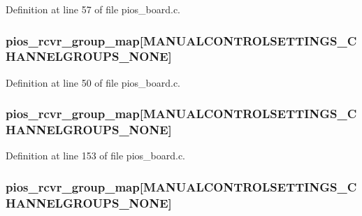 Definition at line 57 of file pios\-\_\-board.\-c.

\hypertarget{group___open_pilot_core_ga6c6cfc16eb738e47c123298e062297e2}{
\subsubsection[{pios\-\_\-rcvr\-\_\-group\-\_\-map}]{ pios\-\_\-rcvr\-\_\-group\-\_\-map\mbox{[}M\-A\-N\-U\-A\-L\-C\-O\-N\-T\-R\-O\-L\-S\-E\-T\-T\-I\-N\-G\-S\-\_\-\-C\-H\-A\-N\-N\-E\-L\-G\-R\-O\-U\-P\-S\-\_\-\-N\-O\-N\-E\mbox{]}}}\label{group___open_pilot_core_ga6c6cfc16eb738e47c123298e062297e2}


Definition at line 50 of file pios\-\_\-board.\-c.

\hypertarget{group___open_pilot_core_ga6c6cfc16eb738e47c123298e062297e2}{
\subsubsection[{pios\-\_\-rcvr\-\_\-group\-\_\-map}]{ pios\-\_\-rcvr\-\_\-group\-\_\-map\mbox{[}M\-A\-N\-U\-A\-L\-C\-O\-N\-T\-R\-O\-L\-S\-E\-T\-T\-I\-N\-G\-S\-\_\-\-C\-H\-A\-N\-N\-E\-L\-G\-R\-O\-U\-P\-S\-\_\-\-N\-O\-N\-E\mbox{]}}}\label{group___open_pilot_core_ga6c6cfc16eb738e47c123298e062297e2}


Definition at line 153 of file pios\-\_\-board.\-c.

\hypertarget{group___open_pilot_core_ga6c6cfc16eb738e47c123298e062297e2}{
\subsubsection[{pios\-\_\-rcvr\-\_\-group\-\_\-map}]{ pios\-\_\-rcvr\-\_\-group\-\_\-map\mbox{[}M\-A\-N\-U\-A\-L\-C\-O\-N\-T\-R\-O\-L\-S\-E\-T\-T\-I\-N\-G\-S\-\_\-\-C\-H\-A\-N\-N\-E\-L\-G\-R\-O\-U\-P\-S\-\_\-\-N\-O\-N\-E\mbox{]}}}\label{group___open_pilot_core_ga6c6cfc16eb738e47c123298e062297e2}


